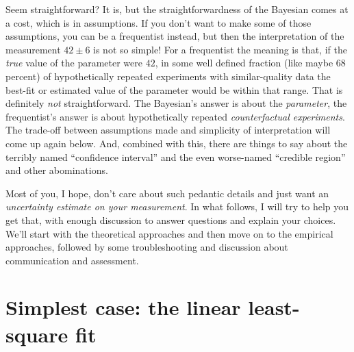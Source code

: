 \documentclass[10pt]{article}
\begin{document}
Seem straightforward? It is, but the straightforwardness of the Bayesian
comes at a cost, which is in assumptions. If you don't want to make some
of those assumptions, you can be a frequentist instead, but then the
interpretation of the measurement $42\pm 6$ is not so simple! For a frequentist
the meaning is that, if the \emph{true}
value of the parameter were $42$,
in some well defined fraction (like maybe 68\,percent)
of hypothetically repeated experiments with similar-quality data the
best-fit or estimated value of the parameter would be within that range.
That is definitely \emph{not} straightforward.
The Bayesian's answer is about the \emph{parameter}, the frequentist's
answer is about hypothetically repeated \emph{counterfactual experiments}.
The trade-off between assumptions made and
simplicity of interpretation will come up again below.
And, combined with this, there are things to say about the terribly named
``confidence interval'' and the even worse-named ``credible region'' and other
abominations.

Most of you, I hope, don't care about such pedantic details and just
want an \emph{uncertainty estimate on your measurement}. In what follows,
I will try to help you get that, with enough discussion to answer questions
and explain your choices. We'll start with the theoretical approaches and
then move on to the empirical approaches, followed by some troubleshooting and
discussion about communication and assessment.

\section{Simplest case: the linear least-square fit}\label{sec:standard}
\end{document}
